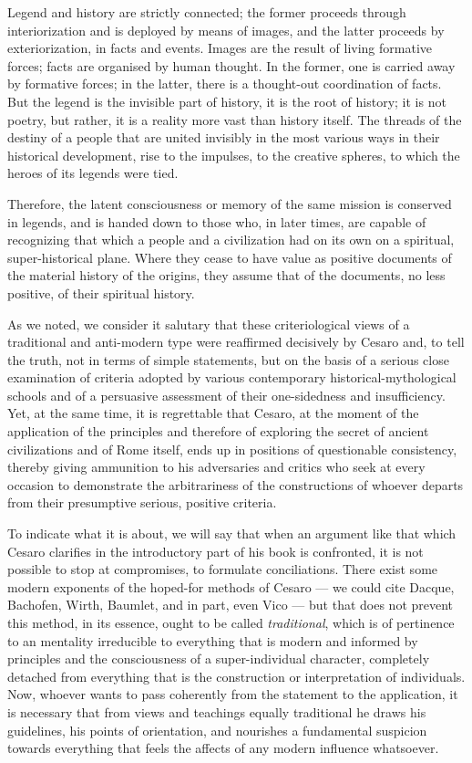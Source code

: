 \begin{quotex}
Legend and history are strictly connected; the former proceeds through interiorization and is deployed by means of images, and the latter proceeds by exteriorization, in facts and events. Images are the result of living formative forces; facts are organised by human thought. In the former, one is carried away by formative forces; in the latter, there is a thought-out coordination of facts. But the legend is the invisible part of history, it is the root of history; it is not poetry, but rather, it is a reality more vast than history itself. The threads of the destiny of a people that are united invisibly in the most various ways in their historical development, rise to the impulses, to the creative spheres, to which the heroes of its legends were tied. 

\end{quotex}
Therefore, the latent consciousness or memory of the same mission is conserved in legends, and is handed down to those who, in later times, are capable of recognizing that which a people and a civilization had on its own on a spiritual, super-historical plane. Where they cease to have value as positive documents of the material history of the origins, they assume that of the documents, no less positive, of their spiritual history.

As we noted, we consider it salutary that these criteriological views of a traditional and anti-modern type were reaffirmed decisively by Cesaro and, to tell the truth, not in terms of simple statements, but on the basis of a serious close examination of criteria adopted by various contemporary historical-mythological schools and of a persuasive assessment of their one-sidedness and insufficiency. Yet, at the same time, it is regrettable that Cesaro, at the moment of the application of the principles and therefore of exploring the secret of ancient civilizations and of Rome itself, ends up in positions of questionable consistency, thereby giving ammunition to his adversaries and critics who seek at every occasion to demonstrate the arbitrariness of the constructions of whoever departs from their presumptive serious, positive criteria.

To indicate what it is about, we will say that when an argument like that which Cesaro clarifies in the introductory part of his book is confronted, it is not possible to stop at compromises, to formulate conciliations. There exist some modern exponents of the hoped-for methods of Cesaro — we could cite Dacque, Bachofen, Wirth, Baumlet, and in part, even Vico — but that does not prevent this method, in its essence, ought to be called \emph{traditional}, which is of pertinence to an mentality irreducible to everything that is modern and informed by principles and the consciousness of a super-individual character, completely detached from everything that is the construction or interpretation of individuals. Now, whoever wants to pass coherently from the statement to the application, it is necessary that from views and teachings equally traditional he draws his guidelines, his points of orientation, and nourishes a fundamental suspicion towards everything that feels the affects of any modern influence whatsoever.

